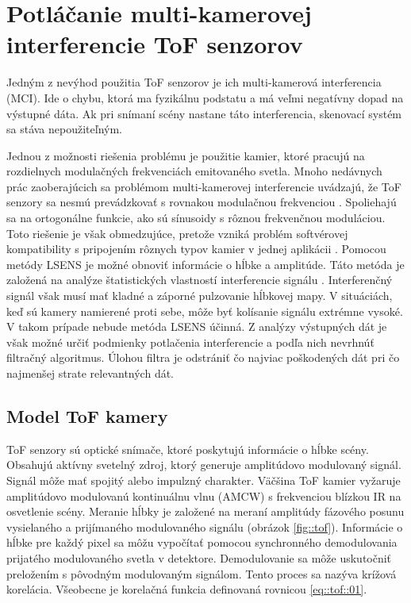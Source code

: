 \chapter{Potláčanie multi-kamerovej interferencie ToF senzorov} 
\label{kap:interference}
\pagestyle{fancy}
\fancyhf{}
\fancyfoot[CE,CO]{\thepage}
\renewcommand{\footrulewidth}{1pt}

Jedným z nevýhod použitia ToF senzorov je ich multi-kamerová interferencia (MCI). Ide o chybu, ktorá ma fyzikálnu podstatu a má veľmi negatívny dopad na výstupné dáta. Ak pri snímaní scény nastane táto interferencia, skenovací systém sa stáva nepoužiteľným. 

Jednou z možnosti riešenia problému je použitie kamier, ktoré pracujú na rozdielnych modulačných frekvenciách emitovaného svetla. Mnoho nedávnych prác zaoberajúcich sa problémom multi-kamerovej interferencie  uvádzajú, že ToF senzory sa nesmú prevádzkovať s rovnakou modulačnou frekvenciou \cite{Kim}. Spoliehajú sa na ortogonálne funkcie, ako sú sínusoidy s rôznou frekvenčnou moduláciou. Toto riešenie je však obmedzujúce, pretože vzniká problém softvérovej kompatibility s pripojením rôznych typov kamier v jednej aplikácii \cite{Buttgen, Whyte, Seitz}.
Pomocou metódy LSENS je možné obnoviť informácie o hĺbke a amplitúde. Táto metóda je založená na analýze štatistických vlastností interferencie signálu \cite{Lianhua}. Interferenčný signál však musí mať kladné a záporné pulzovanie hĺbkovej mapy. V situáciách, keď sú kamery namierené proti sebe, môže byť kolísanie signálu extrémne vysoké. V takom prípade nebude metóda LSENS účinná. Z analýzy výstupných dát je však možné určiť podmienky potlačenia interferencie a podľa nich nevrhnúť filtračný algoritmus. Úlohou filtra je odstrániť čo najviac poškodených dát pri čo najmenšej strate relevantných dát.    


\section{Model ToF kamery}

ToF senzory sú optické snímače, ktoré poskytujú informácie o hĺbke scény. Obsahujú aktívny svetelný zdroj, ktorý generuje amplitúdovo modulovaný signál. Signál môže mať spojitý alebo impulzný charakter. Väčšina ToF kamier vyžaruje amplitúdovo modulovanú kontinuálnu vlnu (AMCW) s frekvenciou blízkou IR na osvetlenie scény. Meranie hĺbky je založené na meraní amplitúdy fázového posunu vysielaného a prijímaného modulovaného signálu (obrázok \ref{fig::tof}). Informácie o hĺbke pre každý pixel sa môžu vypočítať pomocou synchronného demodulovania prijatého modulovaného svetla v detektore. Demodulovanie sa môže uskutočniť preložením s pôvodným modulovaným signálom. Tento proces sa nazýva krížová korelácia. Všeobecne je korelačná funkcia definovaná rovnicou \ref{eq::tof::01}.

